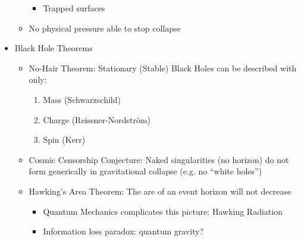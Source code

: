 \begin{itemize}
\begin{itemize}
\begin{itemize}
          \item Trapped surfaces

        \end{itemize}

      \item No physical pressure able to stop collapse

    \end{itemize}

  \item Black Hole Theorems

    \begin{itemize}

      \item No-Hair Theorem: Stationary (Stable) Black Holes can be described with only:

        \begin{enumerate}

          \item Mass (Schwarzschild)

          \item Charge (Reissner-Nordstr\"om)

          \item Spin (Kerr)

        \end{enumerate}

      \item Cosmic Censorship Conjecture: Naked singularities (no horizon) do not form generically in gravitational collapse (e.g. no ``white holes'')

      \item Hawking's Area Theorem: The are of an event horizon will not decrease

        \begin{itemize}

          \item Quantum Mechanics complicates this picture: Hawking Radiation

          \item Information loss paradox: quantum gravity?

        \end{itemize}

    \end{itemize}

\end{itemize}



